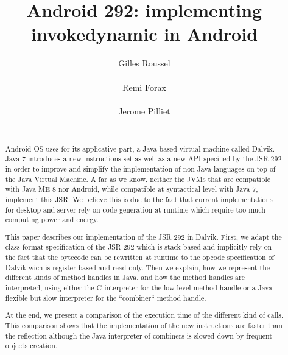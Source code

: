 \documentclass{sig-alternate}
\def \Jsr{JSR\xspace}
\def \JSR{\Jsr 292\xspace}
\begin{document}
\title{Android 292: implementing invokedynamic in Android}

\author{
  \alignauthor Gilles Roussel\\
    \\
  \alignauthor Remi Forax\\
    \\
  \alignauthor Jerome Pilliet\\
    \\
}


\maketitle

\begin{abstract}
Android OS uses for its applicative part, a Java-based virtual machine called Dalvik.
Java 7 introduces a new instructions set as well as a new API  specified by the \JSR
in order to improve and simplify the implementation of non-Java languages on top of the Java Virtual Machine.
A far as we know, neither the JVMs that are compatible with Java ME 8 nor
Android, while compatible at syntactical level with Java 7, implement this \Jsr.
We believe this is due to the fact that current implementations for desktop and server rely
on code generation at runtime which require too much computing power and energy.

This paper describes our implementation of the \JSR in Dalvik.
First, we adapt the class format specification of the \JSR which is stack based and implicitly rely on the fact that the bytecode
can be rewritten at runtime to the opcode specification of Dalvik wich is register based and read only. 
Then we explain, how we represent the different kinds of method handles in Java, and how the method handles are interpreted,
using either the C interpreter for the low level method handle or a Java flexible but slow interpreter for the ``combiner`` method handle.

At the end, we present a comparison of the execution time of the different kind of calls.
This comparison shows that the implementation of the new instructions are faster than the reflection
although the Java interpreter of combiners is slowed down by frequent objects creation.
\end{abstract}
\end{document}
